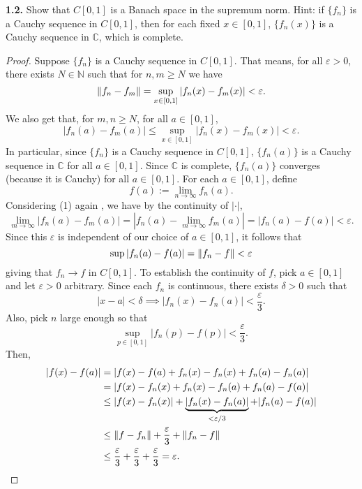 \documentclass[12pt]{article}
\theoremstyle{definition}
\begin{document}
	\newpage 
	\noindent \textbf{1.2.} Show that $C[0, 1]$ is a Banach space in the supremum norm. Hint: if $\{f_n\}$ is a Cauchy sequence in $C[0, 1]$, then for each fixed $x \in [0, 1]$, $\{f_n(x)\}$ is a Cauchy sequence in $\mathbb{C}$, which is complete.
		\begin{proof}
			Suppose $\{f_n\}$ is a Cauchy sequence in $C[0, 1]$. That means, for all $\varepsilon > 0$, there exists $N \in \mathbb{N}$ such that for $n, m \geq N$ we have $$\norm{f_n - f_m} = \sup_{x \in [0, 1]}|f_n(x) - f_m(x)| < \varepsilon.$$ We also get that, for $m, n \geq N$, for all $a \in [0, 1]$,  \begin{equation} |f_n(a) - f_m(a)| \leq \sup_{x \in [0, 1]} |f_n(x) - f_m(x)| < \varepsilon.\end{equation} In particular, since $\{f_n\}$ is a Cauchy sequence in $C[0, 1]$, $\{f_n(a)\}$ is a Cauchy sequence in $\mathbb{C}$ for all $a \in [0, 1]$. Since $\mathbb{C}$ is complete, $\{f_n(a)\}$ converges (because it is Cauchy) for all $a \in [0, 1]$. For each $a \in [0, 1]$, define $$f(a) := \lim_{n \to \infty} f_n(a).$$ Considering (1) again , we have by the continuity of $|\cdot|$,  $$\lim_{m \to \infty} |f_n(a) - f_m(a)| = |f_n(a) - \lim_{m \to \infty} f_m(a)| = |f_n(a) - f(a)| < \varepsilon.$$ Since this $\varepsilon$ is independent of our choice of $a \in [0, 1]$, it follows that $$\sup |f_n(a) - f(a)| = \norm{f_n - f} < \varepsilon$$ giving that $f_n \to f$ in $C[0, 1]$. To establish the continuity of $f$, pick $a \in [0, 1]$ and let $\varepsilon > 0$ arbitrary. Since each $f_n$ is continuous, there exists $\delta > 0$ such that $$|x - a| < \delta \implies |f_n(x) - f_n(a)| < \frac{\varepsilon}{3}.$$ Also, pick $n$ large enough so that  $$\sup_{p \in [0, 1]}|f_n(p) - f(p)| < \frac{\varepsilon}{3}.$$ Then,
				\begin{align*}
					|f(x) - f(a)| &= |f(x) - f(a) + f_n(x) - f_n(x) + f_n(a) - f_n(a)| \\
					&= |f(x) - f_n(x) + f_n(x) - f_n(a) +f_n(a) - f(a)| \\
					&\leq |f(x) - f_n(x)| + \underbrace{|f_n(x) - f_n(a)|}_{< \varepsilon/3} + |f_n(a) - f(a)| \\
					&\leq \norm{f - f_n} + \frac{\varepsilon}{3} + \norm{f_n - f} \\
					&\leq \frac{\varepsilon}{3} + \frac{\varepsilon}{3} + \frac{\varepsilon}{3} = \varepsilon.
				\end{align*}
		\end{proof} 
	
\end{document}
